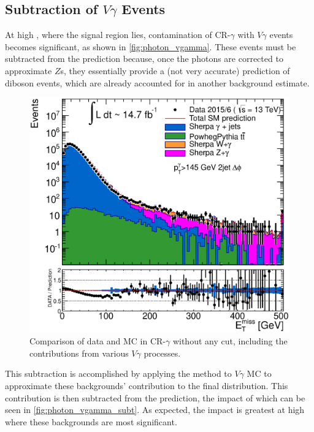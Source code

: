 \subsection{Subtraction of $V\gamma$ Events}
\label{sec:gjets_vg}

At high \met, where the signal region lies, contamination of CR-$\gamma$ with $V\gamma$ events becomes significant, as shown in \autoref{fig:photon_vgamma}. These events must be subtracted from the \gjets prediction because, once the photons are corrected to approximate $Z$s, they essentially provide a (not very accurate) prediction of diboson events, which are already accounted for in another background estimate. 

\begin{centering}
\begin{figure}[!hbt]
\myfloatalign
\includegraphics[width=.90\linewidth]{figures/photons/hPhot_Met_dPhiJet_hist.eps}
\caption{Comparison of data and \ac{MC} in CR-$\gamma$ without any \HT cut, including the contributions from various $V\gamma$ processes.}
\label{fig:photon_vgamma}
\end{figure}
\end{centering}

This subtraction is accomplished by applying the \gjets method to $V\gamma$ \ac{MC} to approximate these backgrounds' contribution to the final \met distribution. This contribution is then subtracted from the \gjets prediction, the impact of which can be seen in \autoref{fig:photon_vgamma_subt}. As expected, the impact is greatest at high \met where these backgrounds are most significant.

